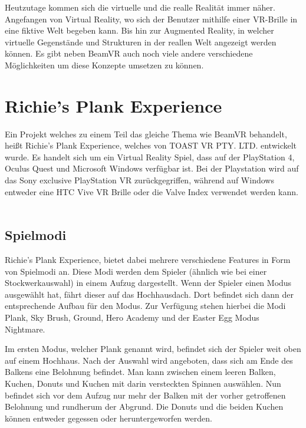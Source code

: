 %

Heutzutage kommen sich die virtuelle und die realle Realität immer näher.
Angefangen von Virtual Reality, wo sich der Benutzer mithilfe einer VR-Brille in eine fiktive Welt begeben kann.
Bis hin zur Augmented Reality, in welcher virtuelle Gegenstände und Strukturen in der reallen Welt angezeigt werden können.
Es gibt neben BeamVR auch noch viele andere verschiedene Möglichkeiten um diese Konzepte umsetzen zu können.



\section{Richie's Plank Experience}
\label{sec:richiesplankexperience}
Ein Projekt welches zu einem Teil das gleiche Thema wie BeamVR behandelt, heißt Richie's Plank Experience, welches von TOAST VR PTY. LTD. entwickelt wurde.
Es handelt sich um ein Virtual Reality Spiel, dass auf der PlayStation 4, Oculus Quest und Microsoft Windows verfügbar ist.
Bei der Playstation wird auf das Sony exclusive PlayStation VR zurückgegriffen, während auf Windows entweder eine HTC Vive VR Brille oder die Valve Index verwendet werden kann.
~\cite{ToastGames_2021}

\subsection{Spielmodi}
\label{sec:richiesplankexperience_modes}
Richie's Plank Experience, bietet dabei mehrere verschiedene Features in Form von Spielmodi an.
Diese Modi werden dem Spieler (ähnlich wie bei einer Stockwerkauswahl) in einem Aufzug dargestellt.
Wenn der Spieler einen Modus ausgewählt hat, fährt dieser auf das Hochhausdach.
Dort befindet sich dann der entsprechende Aufbau für den Modus.
Zur Verfügung stehen hierbei die Modi Plank, Sky Brush, Ground, Hero Academy und der Easter Egg Modus Nightmare.
~\cite{ToastGames_2021_Steam}

Im ersten Modus, welcher Plank genannt wird, befindet sich der Spieler weit oben auf einem Hochhaus.
Nach der Auswahl wird angeboten, dass sich am Ende des Balkens eine Belohnung befindet.
Man kann zwischen einem leeren Balken, Kuchen, Donuts und Kuchen mit darin versteckten Spinnen auswählen.
Nun befindet sich vor dem Aufzug nur mehr der Balken mit der vorher getroffenen Belohnung und rundherum der Abgrund.
Die Donuts und die beiden Kuchen können entweder gegessen oder heruntergeworfen werden.
~\cite{ToastGames_2021_Steam}

